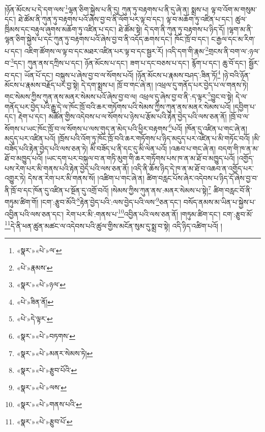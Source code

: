 །ཉོན་མོངས་པ་དེ་དག་ལས་\footnote{«སྣར་»«པེ་»ལ་}ལྷན་ཅིག་སྐྱེས་པ་ནི་དུ། ཀུན་ཏུ་བརྟགས་པ་ནི་དུ་ཞེ་ན། སྨྲས་པ། ལྟ་བ་འོག་མ་གསུམ་དང་། ཐེ་ཚོམ་ནི་ཀུན་ཏུ་བརྟགས་པའོ་ཞེས་བྱ་བ་ནི་ལོག་པར་ལྟ་བ་དང་། ལྟ་བ་མཆོག་ཏུ་འཛིན་པ་དང་། ཚུལ་ཁྲིམས་དང་བརྟུལ་ཞུགས་མཆོག་ཏུ་འཛིན་པ་དང་། ཐེ་ཚོམ་སྟེ། དེ་དག་ནི་ཀུན་ཏུ་བརྟགས་པ་ཉིད་དོ། །ལྷག་མ་ནི་ལྷན་ཅིག་སྐྱེས་པ་དང་ཀུན་ཏུ་བརྟགས་པའོ་ཞེས་བྱ་བ་ནི་འདོད་ཆགས་དང་། ཁོང་ཁྲོ་བ་དང་། ང་རྒྱལ་དང་མ་རིག་པ་དང་། འཇིག་ཚོགས་ལ་ལྟ་བ་དང་མཐར་འཛིན་པར་ལྟ་བ་དང་སྦྱར་རོ། །འདི་དག་གི་རྣམ་\footnote{«པེ་»རྣམས་}གྲངས་ནི་བག་ལ་:ཉལ་བ་\footnote{«སྣར་»«པེ་»ཉལ་}དང་། ཀུན་ནས་དཀྲིས་པ་དང་། ཉོན་མོངས་པ་དང་། ཟག་པ་དང་བཅས་པ་དང་། རྙོག་པ་དང་། ཆུ་བོ་དང་། སྦྱོར་བ་དང་། ཡོན་པོ་དང་། བསྐུས་པ་ཞེས་བྱ་བ་ལ་སོགས་པའོ། །ཉོན་མོངས་པ་རྣམས་བཤད་:ཟིན་ཏོ།\footnote{«པེ་»ཟིན་ནོ།} །ཉེ་བའི་ཉོན་མོངས་པ་རྣམས་བརྗོད་པར་བྱ་སྟེ། དེ་དག་སྨྲས་པ། ཁྲོ་བ་གང་ཞེ་ན། །འཕྲལ་དུ་གནོད་པར་བྱེད་པ་ལ་གནས་ཏེ། གང་སེམས་ཀྱིས་ཀུན་ནས་མནར་སེམས་པའོ་ཞེས་བྱ་བ་ལ། འཕྲལ་དུ་ཞེས་བྱ་བ་ནི་:ད་ལྟར་\footnote{«པེ་»དེ་ལྟར་}བྱུང་བ་སྟེ། དེ་ལ་གནོད་པར་བྱེད་པའི་རྒྱུ་དེ་ལ་ཁོང་ཁྲོ་བའི་ཆར་གཏོགས་པའི་སེམས་ཀྱིས་ཀུན་ནས་མནར་སེམས་པའོ། །དབྱིག་པ་དང་། རྡེག་པ་དང་། མཚོན་གྱིས་འདེབས་པ་ལ་སོགས་པ་ཉེས་པ་རྩོམ་པའི་རྟེན་བྱེད་པའི་ལས་ཅན་ནོ། །ཁྲོ་བ་ལ་སོགས་པ་ཡང་ཁོང་ཁྲོ་བ་ལ་སོགས་པ་ལས་གུད་ན་མེད་པའི་ཕྱིར་བརྟགས་\footnote{«སྣར་»«པེ་»བཏགས་}པའོ། །ཁོན་དུ་འཛིན་པ་གང་ཞེ་ན། མདུད་པར་འཛིན་པའོ། །ཁྲོས་པའི་འོག་ཏུ་ཁོང་ཁྲོ་བའི་ཆར་གཏོགས་པ་ཉིད་མདུད་པར་འཛིན་པ་མི་གཏོང་བའོ། །མི་བཟོད་པའི་རྟེན་བྱེད་པའི་ལས་ཅན་ཏེ། མི་བཟོད་པ་ནི་དང་དུ་མི་ལེན་པའོ། །འཆབ་པ་གང་ཞེ་ན། བདག་གི་ཁ་ན་མ་ཐོ་བ་མཁྱུད་པའོ། །ཡང་དག་པར་བསྐུལ་བ་ན་གཏི་མུག་གི་ཆར་གཏོགས་པས་ཁ་ན་མ་ཐོ་བ་མཁྱུད་པའོ། །འགྱོད་པས་རེག་པར་མི་གནས་པའི་རྟེན་བྱེད་པའི་ལས་ཅན་ནོ། །འདི་ནི་ཆོས་ཉིད་དེ་ཁ་ན་མ་ཐོ་བ་འཆབ་ན་འགྱོད་པར་འགྱུར་ཏེ། དེས་ན་རེག་པར་མི་གནས་སོ། །འཚིག་པ་གང་ཞེ་ན། ཚིག་བརླང་པོས་ཞེར་འདེབས་པ་ཉིད་དོ་ཞེས་བྱ་བ་ནི་ཁྲོ་བ་དང་ཁོན་དུ་འཛིན་པ་སྔོན་དུ་འགྲོ་བའོ། །སེམས་ཀྱིས་ཀུན་ནས་:མནར་སེམས་པ་སྟེ།\footnote{«སྣར་»«པེ་»མནར་སེམས་ཏེ།} ཚིག་བརླང་བོ་ནི་གཏུམ་ཚིག་གོ། །ངག་:རྩུབ་མོའི་\footnote{«སྣར་»«པེ་»རྩུབ་པོའི་}རྟེན་བྱེད་པའི་:ལས་བྱེད་པའི་ལས་\footnote{«སྣར་»«པེ་»ལས་}ཅན་དང་། བསོད་ནམས་མ་ཡིན་པ་སྐྱེས་པ་འབྱིན་པའི་ལས་ཅན་དང་། རེག་པར་མི་:གནས་པ་\footnote{«སྣར་»«པེ་»གནས་པའི་}འབྱིན་པའི་ལས་ཅན་ནོ། །གཏུམ་ཚིག་དང་། ངག་:རྩུབ་མོ་\footnote{«སྣར་»«པེ་»རྩུབ་པོ་}དེ་ནི་ཕན་ཚུན་མཚང་ལ་འདེབས་པའི་ཚུལ་གྱིས་མངོན་སུམ་དུ་སྨྲ་བ་སྟེ། འདི་ཉིད་འཚིག་པའོ། །
